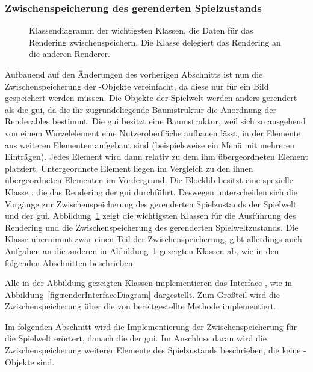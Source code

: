 \subsubsection{Zwischenspeicherung des gerenderten Spielzustands}\label{sec:saveRenderState}
\begin{figure}
	\centering
	
	\caption[Klassendiagramm der wichtigsten Klassen, die Daten für das Rendering zwischenspeichern.]{Klassendiagramm der wichtigsten Klassen, die Daten für das Rendering zwischenspeichern. Die Klasse  delegiert das Rendering an die anderen Renderer.}\label{fig:renderDiagram}
\end{figure}
Aufbauend auf den Änderungen des vorherigen Abschnitts ist nun die Zwischenspeicherung der -Objekte vereinfacht, da diese nur für ein Bild gespeichert werden müssen. Die Objekte der Spielwelt werden anders gerendert als die \ac{gui}, da die ihr zugrundeliegende Baumstruktur die Anordnung der Renderables bestimmt. Die \ac{gui} besitzt eine Baumstruktur, weil sich so ausgehend von einem Wurzelelement eine Nutzeroberfläche aufbauen lässt, in der Elemente aus weiteren Elementen aufgebaut sind (beispielsweise ein Menü mit mehreren Einträgen). Jedes Element wird dann relativ zu dem ihm übergeordneten Element platziert. Untergeordnete Element liegen im Vergleich zu den ihnen übergeordneten Elementen im Vordergrund. Die Blocklib besitzt eine spezielle Klasse , die das Rendering der \ac{gui} durchführt. Deswegen unterscheiden sich die Vorgänge zur Zwischenspeicherung des gerenderten Spielzustands der Spielwelt und der \ac{gui}. Abbildung~\ref{fig:renderDiagram} zeigt die wichtigsten Klassen für die Ausführung des Rendering und die Zwischenspeicherung des gerenderten Spielweltzustands. Die Klasse  übernimmt zwar einen Teil der Zwischenspeicherung, gibt allerdings auch Aufgaben an die anderen in Abbildung~\ref{fig:renderDiagram} gezeigten Klassen ab, wie in den folgenden Abschnitten beschrieben.

Alle in der Abbildung gezeigten Klassen implementieren das Interface , wie in Abbildung~\ref{fig:renderInterfaceDiagram} dargestellt. Zum Großteil wird die Zwischenspeicherung über die von  bereitgestellte Methode  implementiert.

Im folgenden Abschnitt wird die Implementierung der Zwischenspeicherung für die Spielwelt erörtert, danach die der \ac{gui}. Im Anschluss daran wird die Zwischenspeicherung weiterer Elemente des Spielzustands beschrieben, die keine -Objekte sind.

